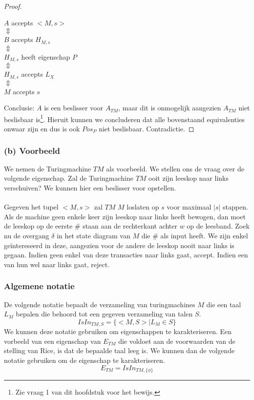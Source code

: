 \begin{proof}
	\begin{center}
		$A$ accepts $<M,s>$\\
		$\Updownarrow$\\
		$B$ accepts $H_{M,s}$\\
		$\Updownarrow$\\
		$H_{M,s}$ heeft eigenschap $P$\\
		$\Updownarrow$\\
		$H_{M,s}$ accepts $L_X$\\
		$\Updownarrow$\\
		$M$ accepts $s$
	\end{center}
	Conclusie: $A$ is een beslisser voor $A_{TM}$, maar dit is onmogelijk aangezien $A_{TM}$ niet beslisbaar is\footnote{Zie vraag 1 van dit hoofdstuk voor het bewijs.}. Hieruit kunnen we concluderen dat alle bovenstaand equivalenties onwaar zijn en dus is  ook $Pos_P$ niet beslisbaar. Contradictie.
\end{proof}

\subsubsection*{(b) Voorbeeld}

We nemen de Turingmachine $TM$ als voorbeeld. We stellen ons de vraag over de volgende eigenschap. Zal de Turingmachine $TM$ ooit zijn leeskop naar links verschuiven? We kunnen hier een beslisser voor opstellen.
\\\\
Gegeven het tupel $<M,s>$ zal $TM$ $M$ loslaten op $s$ voor maximaal $|s|$ stappen. Als de machine geen enkele keer zijn leeskop naar links heeft bewogen, dan moet de leeskop op de eerste $\#$ staan aan de rechterkant achter $w$ op de leesband. Zoek nu de overgang $\delta$ in het state diagram van $M$ die $\#$ als input heeft. We zijn enkel ge\"intereseerd in deze, aangezien voor de andere de leeskop nooit naar links is gegaan. Indien geen enkel van deze transacties naar links gaat, accept. Indien een van hun wel naar links gaat, reject.

\subsubsection*{Algemene notatie}

De volgende notatie bepaalt de verzameling van turingmachines $M$ die een taal $L_M$ bepalen die behoord tot een gegeven verzameling van talen $S$.
$$IsIn_{TM,S}=\{<M,S>|L_M \in S\}$$
We kunnen deze notatie gebruiken om eigenschappen te karakteriseren. Een vorbeeld van een eigenschap van $E_{TM}$ die voldoet aan de voorwaarden van de stelling van Rice, is dat de bepaalde taal leeg is. We kunnen dan de volgende notatie gebruiken om de eigenschap te karakteriseren.
$$E_{TM} = IsIn_{TM,\{\phi\}}$$